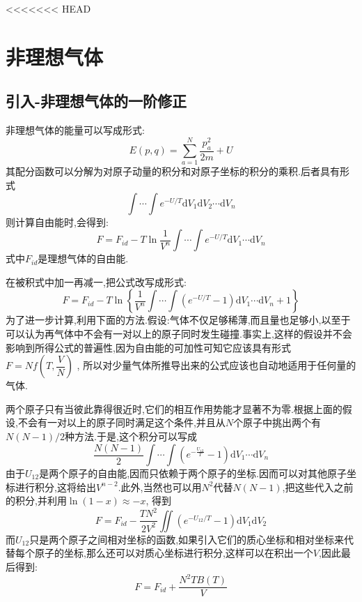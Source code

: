 <<<<<<< HEAD


\section{非理想气体}
\subsection{引入-非理想气体的一阶修正}

  非理想气体的能量可以写成形式:
  \begin{equation}
    E(p,q)=\sum_{a=1}^{N} \dfrac{p_a^{2}}{2m}+U
  \end{equation}
  其配分函数可以分解为对原子动量的积分和对原子坐标的积分的乘积.后者具有形式
  \[\int \cdots \int e^{-U / T}\mathrm{d} V_1 \mathrm{d} V_2 \cdots \mathrm{d} V_n\]
  则计算自由能时,会得到:
  \begin{equation}
    F=F_{id}-T\ln \frac{1}{V^{n}}\int\cdots \int e^{-U / T}\mathrm{d} V_1 \cdots \mathrm{d}  V_n
  \end{equation}
  式中$F_{id}$是理想气体的自由能.

  在被积式中加一再减一,把公式改写成形式:
  \begin{equation}
    F=F_{id}-T\ln\left\{ \frac{1}{V^{n}} \int \cdots \int (e^{-U / T}-1)\mathrm{d} V_1 \cdots\mathrm{d} V_n +1 \right\} 
  \end{equation}
  为了进一步计算,利用下面的方法.假设:气体不仅足够稀薄,而且量也足够小,以至于可以认为再气体中不会有一对以上的原子同时发生碰撞.事实上,这样的假设并不会影响到所得公式的普遍性,因为自由能的可加性可知它应该具有形式$F=N f\left( T,\dfrac{V}{N} \right) $ , 所以对少量气体所推导出来的公式应该也自动地适用于任何量的气体.

  两个原子只有当彼此靠得很近时,它们的相互作用势能才显著不为零.根据上面的假设,不会有一对以上的原子同时满足这个条件,并且从$N$个原子中挑出两个有$N(N-1)/2$种方法.于是,这个积分可以写成
  \[\dfrac{N(N-1)}{2}\int \cdots \int (e^{-\frac{U_{12}}{T}}-1)\mathrm{d} V_1 \cdots\mathrm{d} V_n\]
  由于$U_{12}$是两个原子的自由能,因而只依赖于两个原子的坐标.因而可以对其他原子坐标进行积分,这将给出$V^{n-2}$.此外,当然也可以用$N^{2}$代替$N(N-1)$,把这些代入之前的积分,并利用$\ln(1-x)\approx -x$, 得到
  \begin{equation}
    F=F_{id}-\dfrac{TN^{2}}{2V^{2}} \iint (e^{-U_{12} / T}-1)\mathrm{d} V_1 \mathrm{d} V_2
  \end{equation}
  而$U_{12}$只是两个原子之间相对坐标的函数,如果引入它们的质心坐标和相对坐标来代替每个原子的坐标,那么还可以对质心坐标进行积分,这样可以在积出一个$V$,因此最后得到:
  \begin{equation}
    F=F_{id}+\dfrac{N^{2}TB(T)}{V}
  \end{equation}
  
